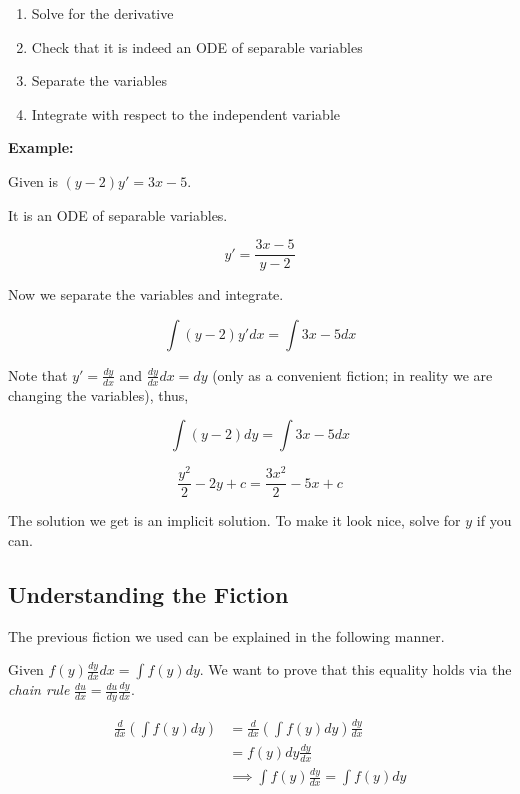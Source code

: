 \begin{enumerate}

    \item Solve for the derivative

    \item Check that it is indeed an ODE of separable variables

    \item Separate the variables

    \item Integrate with respect to the independent variable

\end{enumerate}

\textbf{Example:}

Given is \((y - 2)y' = 3x - 5\).

It is an ODE of separable variables.

\[
    y' = \frac{3x - 5}{y - 2}
\]

Now we separate the variables and integrate.

\[
    \int (y - 2)y' dx = \int 3x - 5 dx
\]

Note that \(y' = \frac{dy}{dx}\) and \( \frac{dy}{dx} dx = dy\) (only as a convenient fiction;
in reality we are changing the variables), thus,

\[
    \int (y - 2)dy = \int 3x - 5 dx
\]

\[
    \frac{y^2}{2} - 2y + c = \frac{3x^2}{2} - 5x + c
\]

The solution we get is an implicit solution. To make it look nice, solve for \(y\)
if you can.

\subsection{Understanding the Fiction}

The previous fiction we used can be explained in the following manner.

Given \( f(y) \frac{dy}{dx} dx = \int f(y) dy\). We want to prove that this equality holds via the
\emph{chain rule} \(\frac{du}{dx} = \frac{du}{dy} \frac{dy}{dx}\).

\begin{align*}
    \frac{d}{dx} \left( \int f(y) dy \right) & = \frac{d}{dx} \left( \int f(y) dy \right) \frac{dy}{dx} \\
                                             & = f(y) dy \frac{dy}{dx}                                  \\
                                             & \implies \int f(y) \frac{dy}{dx} = \int f(y) dy
\end{align*}
\QED

